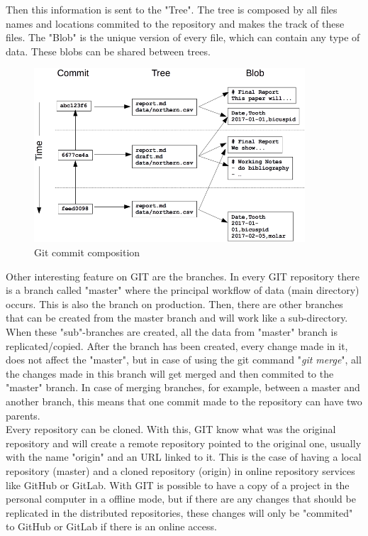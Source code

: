 \documentclass[mim_thesis.tex]{subfiles}
\begin{document}
Then this information is sent to the "Tree". The tree is composed by all files names and locations commited to the repository and makes the track of these files. The "Blob" is the unique version of every file, which can contain any type of data. These blobs can be shared between trees.\\

\begin{figure}[H]
	\centering
    \includegraphics[width=0.9\textwidth]{img/git_commit_areas.PNG}
	\caption{Git commit composition \citep{datacamp2017}}
	\label{fig:git_commit_areas}
\end{figure}

Other interesting feature on GIT are the branches. In every GIT repository there is a branch called "master" where the principal workflow of data (main directory) occurs. This is also the branch on production. Then, there are other branches that can be created from the master branch and will work like a sub-directory. When these "sub"-branches are created, all the data from "master" branch is replicated/copied. After the branch has been created, every change made in it, does not affect the "master", but in case of using the git command "\textit{git merge}", all the changes made in this branch will get merged and then commited to the "master" branch. In case of merging branches, for example, between a master and another branch, this means that one commit made to the repository can have two parents. \\

Every repository can be cloned. With this, GIT know what was the original repository and will create a remote repository pointed to the original one, usually with the name "origin" and an \ac{URL} linked to it. This is the case of having a local repository (master) and a cloned repository (origin) in online repository services like GitHub or GitLab. With GIT is possible to have a copy of a project in the personal computer in a offline mode, but if there are any changes that should be replicated in the distributed repositories, these changes will only be "commited" to GitHub or GitLab if there is an online access.   
\end{document}

